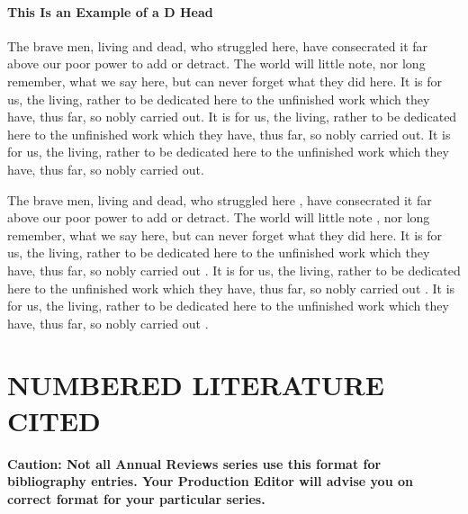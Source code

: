 \documentclass{ar2e}
\begin{document}
\paragraph{This Is an Example of a D Head}
The brave men, living and dead, who struggled
here, have consecrated it far above our poor power to add or detract. The
world will little note, nor long remember, what we say here, but can never
forget what they did here. It is for us, the living, rather to be
dedicated here to the unfinished work which they have, thus far, so nobly
carried out. It is for us, the living, rather to be
dedicated here to the unfinished work which they have, thus far, so nobly
carried out. It is for us, the living, rather to be
dedicated here to the unfinished work which they have, thus far, so nobly
carried out. 

The brave men, living and dead, who struggled 
here \cite{Bishop68}, have consecrated it far above our poor power to add or detract. The
world will little note \cite{Connolly83}, nor long remember, what we say here, but can never
forget what they did here. It is for us, the living, rather to be
dedicated here to the unfinished work which they have, thus far, so nobly
carried out \cite{Doscher63}. It is for us, the living, rather to be
dedicated here to the unfinished work which they have, thus far, so nobly
carried out \cite{Heitzmann74}. It is for us, the living, rather to be
dedicated here to the unfinished work which they have, thus far, so nobly
carried out \cite{Hellinga94,Klee57,Lee71,Low52,Ponder87}. 

\section{NUMBERED LITERATURE CITED}

{\bf Caution: Not all Annual Reviews series use this format for
bibliography entries. Your Production Editor will advise you on correct format for
your particular series.}\newline
\end{document}
